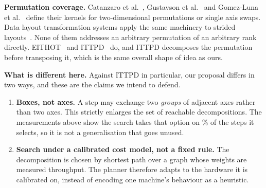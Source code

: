 \textbf{Permutation coverage.} Catanzaro et
al.~\cite{catanzaro2014decomposition}, Gustavson et
al.~\cite{gustavson2012cycleleader} and Gomez-Luna et
al.~\cite{gomezluna2016inplace} define their kernels for two-dimensional
permutations or single axis swaps. Data layout transformation systems apply
the same machinery to strided layouts~\cite{sung2012pttwac}. None of them
addresses an arbitrary permutation of an arbitrary rank directly.
\textsc{EITHOT}~\cite{wu2025eithot} and
\textsc{ITTPD}~\cite{cheng2025ittpd} do, and \textsc{ITTPD} decomposes the
permutation before transposing it, which is the same overall shape of idea as
ours.

\textbf{What is different here.} Against \textsc{ITTPD} in particular, our
proposal differs in two ways, and these are the claims we intend to defend.

\begin{enumerate}
\item \textbf{Boxes, not axes.} A step may exchange two \emph{groups} of
  adjacent axes rather than two axes. This strictly enlarges the set of
  reachable decompositions. The measurements above show the search takes that
  option on \planBlockShare{}\% of the steps it selects, so it is not a
  generalisation that goes unused.
\item \textbf{Search under a calibrated cost model, not a fixed rule.} The
  decomposition is chosen by shortest path over a graph whose weights are
  measured throughput. The planner therefore adapts to the hardware it is
  calibrated on, instead of encoding one machine's behaviour as a heuristic.
\end{enumerate}



